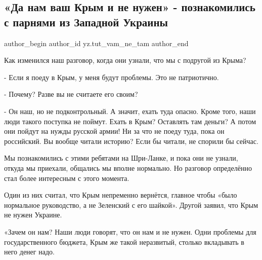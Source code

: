  
 
 
 
 
 
\subsection{«Да нам ваш Крым и не нужен» - познакомились с парнями из Западной Украины}
\label{sec:06_02_2022.yz.tut_vam_ne_tam.1.nam_vash_krym_i_ne_nuzhen_zapad_ukr}
 
\ifcmt
 author_begin
   author_id yz.tut_vam_ne_tam
 author_end
\fi

Как изменился наш разговор, когда они узнали, что мы с подругой из Крыма?

- Если я поеду в Крым, у меня будут проблемы. Это не патриотично. 

- Почему? Разве вы не считаете его своим? 

- Он наш, но не подконтрольный. А значит, ехать туда опасно. Кроме того, наши
люди такого поступка не поймут. Ехать в Крым? Оставлять там деньги? А потом они
пойдут на нужды русской армии!  Ни за что не поеду туда, пока он российский. Вы
вообще читали историю? Если бы читали, не спорили бы сейчас.

Мы познакомились с этими ребятами на Шри-Ланке, и пока они не узнали, откуда мы
приехали, общались мы вполне нормально. Но разговор определённо стал более
интересным с этого момента.


Один из них считал, что Крым непременно вернётся, главное чтобы «было
нормальное руководство, а не Зеленский с его шайкой». Другой заявил, что Крым
не нужен Украине.

«Зачем он нам? Наши люди говорят, что он нам и не нужен. Одни проблемы для
государственного бюджета, Крым же такой неразвитый, столько вкладывать в него
денег надо.


